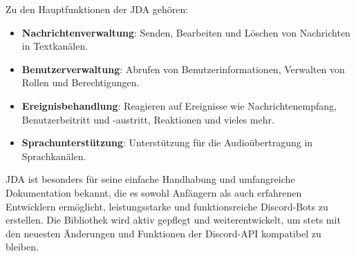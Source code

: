 \begin{itemize}
        Zu den Hauptfunktionen der JDA gehören:
        \begin{itemize}
            \item \textbf{Nachrichtenverwaltung}: Senden, Bearbeiten und Löschen von Nachrichten in Textkanälen.
            \item \textbf{Benutzerverwaltung}: Abrufen von Benutzerinformationen, Verwalten von Rollen und Berechtigungen.
            \item \textbf{Ereignisbehandlung}: Reagieren auf Ereignisse wie Nachrichtenempfang, Benutzerbeitritt und -austritt, Reaktionen und vieles mehr.
            \item \textbf{Sprachunterstützung}: Unterstützung für die Audioübertragung in Sprachkanälen.
        \end{itemize}
        
        JDA ist besonders für seine einfache Handhabung und umfangreiche Dokumentation bekannt, die es sowohl Anfängern als auch erfahrenen Entwicklern ermöglicht, leistungsstarke und funktionsreiche Discord-Bots zu erstellen. Die Bibliothek wird aktiv gepflegt und weiterentwickelt, um stets mit den neuesten Änderungen und Funktionen der Discord-API kompatibel zu bleiben.
\end{itemize}